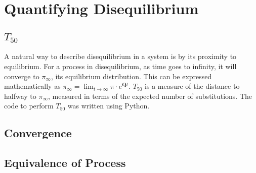\chapter{Quantifying Disequilibrium}


\section{$T_{50}$}
A natural way to describe disequilibrium in a system is by its proximity to equilibrium. For a process in disequilibrium, as time goes to infinity, it will converge to $\pi_\infty$, its equilibrium distribution. This can be expressed mathematically as $\pi_\infty = \lim_{t \to \infty}\pi \cdot e^{\mathbf{Q}t}.$ ${T_{50}}$ is a measure of the distance to halfway to $\pi_\infty$, measured in terms of the expected number of substitutions. The code to perform $T_{50}$ was written using Python.


\section{Convergence}

\section{Equivalence of Process}
